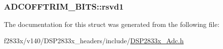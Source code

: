 \subsubsection[{rsvd1}]{ A\+D\+C\+O\+F\+F\+T\+R\+I\+M\+\_\+\+B\+I\+T\+S\+::rsvd1}\label{struct_a_d_c_o_f_f_t_r_i_m___b_i_t_s_ab0345669cb0764ee41ba705b1ddaf8bf}


The documentation for this struct was generated from the following file\+:\begin{DoxyCompactItemize}
\item 
f2833x/v140/\+D\+S\+P2833x\+\_\+headers/include/\hyperlink{_d_s_p2833x___adc_8h}{D\+S\+P2833x\+\_\+\+Adc.\+h}\end{DoxyCompactItemize}
